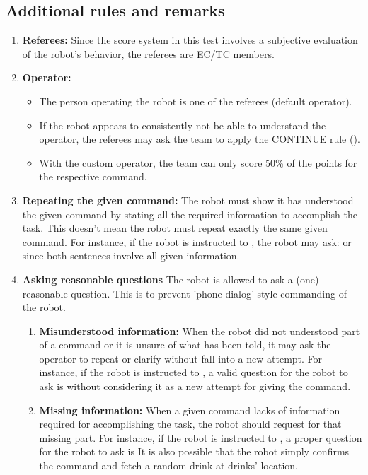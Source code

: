 \subsection{Additional rules and remarks}
\label{sec:gpsr_remarks}
\begin{enumerate}
	\item \textbf{Referees:} Since the score system in this test involves a subjective evaluation of the robot's behavior, the referees are EC/TC members.
	\item \textbf{Operator:}
	\begin{itemize}
		\item The person operating the robot is one of the referees (default operator).
		\item If the robot appears to consistently not be able to understand the operator, the referees may ask the team to apply the CONTINUE rule (). 
		\item With the custom operator, the team can only score 50\% of the points for the respective command.
	\end{itemize}
	\item \textbf{Repeating the given command:} The robot must show it has understood the given command by stating all the required information to accomplish the task. This doesn't mean the robot must repeat exactly the same given command. For instance, if the robot is instructed to \textit{}, the robot may ask: \textit{} or \textit{} since both sentences involve all given information.
	\item \textbf{Asking reasonable questions} 
	The robot is allowed to ask a (one) reasonable question. This is to prevent 'phone dialog' style commanding of the robot. 
	\begin{enumerate}
		\item \textbf{Misunderstood information:} When the robot did not understood part of a command or it is unsure of what has been told, it may ask the operator to repeat or clarify without fall into a new attempt. For instance, if the robot is instructed to \textit{}, a valid question for the robot to ask is \textit{} without considering it as a new attempt for giving the command.
		\item \textbf{Missing information:} When a given command lacks of information required for accomplishing the task, the robot should request for that missing part. For instance, if the robot is instructed to \textit{}, a proper question for the robot to ask is \textit{} It is also possible that the robot simply confirms the command and fetch a random drink at drinks' location.

\end{enumerate}
\end{enumerate}
